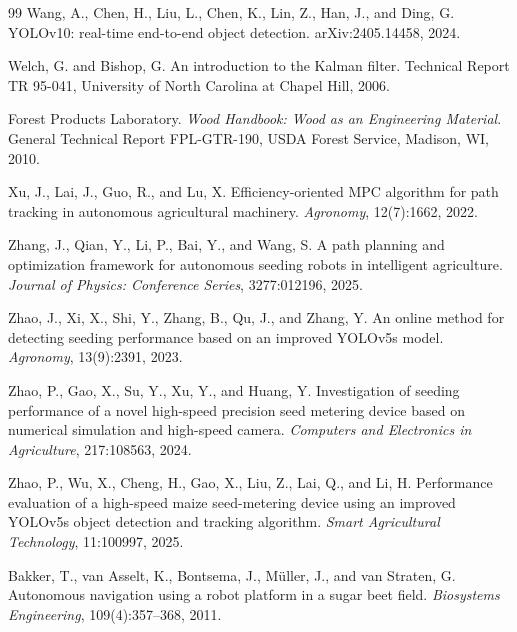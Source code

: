 \begin{thebibliography}{99}
Wang, A., Chen, H., Liu, L., Chen, K., Lin, Z., Han, J., and Ding, G.
YOLOv10: real-time end-to-end object detection.
arXiv:2405.14458, 2024.

Welch, G. and Bishop, G.
An introduction to the Kalman filter.
Technical Report TR 95-041, University of North Carolina at Chapel Hill, 2006.

Forest Products Laboratory.
\textit{Wood Handbook: Wood as an Engineering Material}.
General Technical Report FPL-GTR-190, USDA Forest Service, Madison, WI, 2010.

Xu, J., Lai, J., Guo, R., and Lu, X.
Efficiency-oriented MPC algorithm for path tracking in autonomous agricultural machinery.
\textit{Agronomy}, 12(7):1662, 2022.

Zhang, J., Qian, Y., Li, P., Bai, Y., and Wang, S.
A path planning and optimization framework for autonomous seeding robots in intelligent agriculture.
\textit{Journal of Physics: Conference Series}, 3277:012196, 2025.

Zhao, J., Xi, X., Shi, Y., Zhang, B., Qu, J., and Zhang, Y.
An online method for detecting seeding performance based on an improved YOLOv5s model.
\textit{Agronomy}, 13(9):2391, 2023.

Zhao, P., Gao, X., Su, Y., Xu, Y., and Huang, Y.
Investigation of seeding performance of a novel high-speed precision seed metering device based on numerical simulation and high-speed camera.
\textit{Computers and Electronics in Agriculture}, 217:108563, 2024.

Zhao, P., Wu, X., Cheng, H., Gao, X., Liu, Z., Lai, Q., and Li, H.
Performance evaluation of a high-speed maize seed-metering device using an improved YOLOv5s object detection and tracking algorithm.
\textit{Smart Agricultural Technology}, 11:100997, 2025.

Bakker, T., van Asselt, K., Bontsema, J., M{\"u}ller, J., and van Straten, G.
Autonomous navigation using a robot platform in a sugar beet field.
\textit{Biosystems Engineering}, 109(4):357--368, 2011.

\end{thebibliography}
